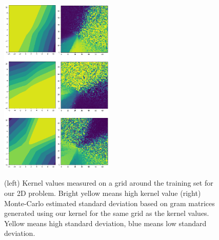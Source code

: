     \begin{figure}[h]
        \centering
        \includegraphics[width=0.24\textwidth]{c4_figures/kers_square.png}\includegraphics[width=0.24\textwidth]{c4_figures/vars_square.png}
        \caption{(left) Kernel values measured on a grid around the training set for our 2D problem. Bright yellow means high kernel value (right) Monte-Carlo estimated standard deviation based on gram matrices generated using our kernel for the same grid as the kernel values. Yellow means high standard deviation, blue means low standard deviation.}
        \label{fig:cov}
    \end{figure}

